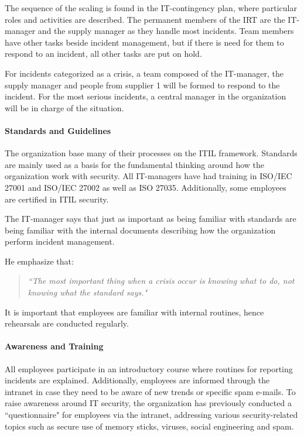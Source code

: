 The sequence of the scaling is found in the IT-contingency plan, where particular roles and activities are described. The permanent members of the \ac{IRT} are the IT-manager and the supply manager as they handle most incidents. Team members have other tasks beside incident management, but if there is need for them to respond to an incident, all other tasks are put on hold.

For incidents categorized as a crisis, a team composed of the IT-manager, the supply manager and people from supplier 1 will be formed to respond to the incident. For the most serious incidents, a central manager in the organization will be in charge of the situation.

\paragraph{Standards and Guidelines}
The organization base many of their processes on the ITIL framework. Standards are mainly used as a basis for the fundamental thinking around how the organization work with security. All IT-managers have had training in ISO/IEC 27001 and ISO/IEC 27002 as well as ISO 27035. Additionally, some employees are certified in ITIL security.   

The IT-manager says that just as important as being familiar with standards are being familiar with the internal documents describing how the organization perform incident management. 

He emphasize that:
\begin{quote}
\textit{``The most important thing when a crisis occur is knowing what to do, not knowing what the standard says."}
\end{quote}
It is important that employees are familiar with internal routines, hence rehearsals are conducted regularly.

\paragraph{Awareness and Training}
All employees participate in an introductory course where routines for reporting incidents are explained. Additionally, employees are informed through the intranet in case they need to be aware of new trends or specific spam e-mails. To raise awareness around IT security, the organization has previously conducted a ``questionnaire" for employees via the intranet, addressing various security-related topics such as secure use of memory sticks, viruses, social engineering and spam. 


